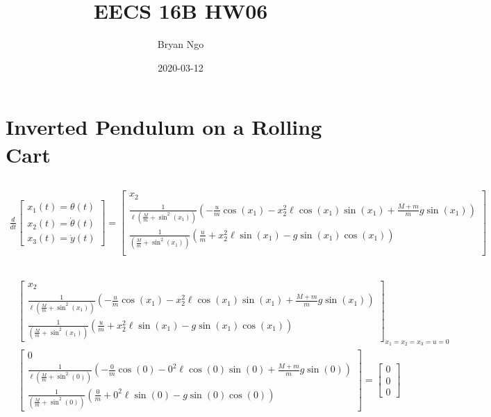 \documentclass[]{article}
\title{EECS 16B HW06}
\author{Bryan Ngo}
\date{2020-03-12}
\newcommand{\diff}[1]{\frac{d}{d #1}}
\begin{document}
\maketitle

\section{Inverted Pendulum on a Rolling Cart}

\subsection{}

\begin{align}
	\diff{t} \begin{bmatrix}
	x_1(t) = \theta(t) \\
	x_2(t) = \dot{\theta}(t) \\
	x_3(t) = \dot{y}(t)
	\end{bmatrix} =
	\begin{bmatrix}
	x_2 \\
	\frac{1}{\ell \left(\frac{M}{m} + \sin^2(x_1) \right)} \left(-\frac{u}{m} \cos(x_1) - x_2^2 \ell \cos(x_1) \sin(x_1) + \frac{M + m}{m} g \sin(x_1)\right) \\
	\frac{1}{\left(\frac{M}{m} + \sin^2(x_1) \right)} \left(\frac{u}{m} + x_2^2 \ell \sin(x_1) - g \sin(x_1) \cos(x_1) \right) \\
	\end{bmatrix}
\end{align}

\subsection{}

\begin{align}
	&\begin{bmatrix}
	x_2 \\
	\frac{1}{\ell \left(\frac{M}{m} + \sin^2(x_1) \right)} \left(-\frac{u}{m} \cos(x_1) - x_2^2 \ell \cos(x_1) \sin(x_1) + \frac{M + m}{m} g \sin(x_1)\right) \\
	\frac{1}{\left(\frac{M}{m} + \sin^2(x_1) \right)} \left(\frac{u}{m} + x_2^2 \ell \sin(x_1) - g \sin(x_1) \cos(x_1) \right)
	\end{bmatrix}_{x_1 = x_2 = x_3 = u = 0} \\
	&\begin{bmatrix}
	0 \\
	\frac{1}{\ell \left(\frac{M}{m} + \sin^2(0) \right)} \left(-\frac{0}{m} \cos(0) - 0^2 \ell \cos(0) \sin(0) + \frac{M + m}{m} g \sin(0)\right) \\
	\frac{1}{\left(\frac{M}{m} + \sin^2(0) \right)} \left(\frac{0}{m} + 0^2 \ell \sin(0) - g \sin(0) \cos(0) \right)
	\end{bmatrix} =
	\begin{bmatrix}
	0 \\
	0 \\
	0
	\end{bmatrix}
\end{align}
\end{document}
